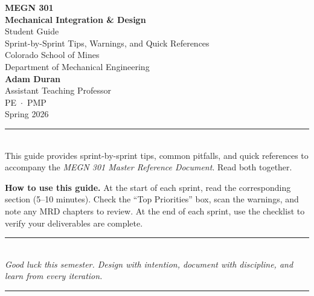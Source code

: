\documentclass[11pt,letterpaper]{article}
\newcommand{\currentsemester}{Spring 2026}
\begin{document}

\begin{center}
    \vspace*{0.5cm}
    {\Huge\bfseries\sffamily\textcolor{MinesBlue}{MEGN 301}}\\[0.3cm]
    {\Huge\bfseries\sffamily\textcolor{MinesBlue}{Mechanical Integration \& Design}}\\[1cm]
    {\huge\sffamily\textcolor{MinesBlue}{Student Guide}}\\[0.6cm]
    {\Large\sffamily Sprint-by-Sprint Tips, Warnings, and Quick References}\\[1.5cm]
    {\large\sffamily\textcolor{MinesSilver}{Colorado School of Mines}}\\[0.2cm]
    {\large\sffamily\textcolor{MinesSilver}{Department of Mechanical Engineering}}\\[1cm]
    {\Large\sffamily\textbf{Adam Duran}}\\[0.2cm]
    {\normalsize\sffamily Assistant Teaching Professor}\\[0.2cm]
    {\normalsize\sffamily\textcolor{MinesSilver}{PE \,$\cdot$\, PMP}}\\[1cm]
    {\normalsize\sffamily\textcolor{MinesSilver}{\currentsemester}}\\[0.5cm]
    \textcolor{MinesBlue}{\rule{0.6\textwidth}{1pt}}\\[0.3cm]
    {\small\sffamily This guide provides sprint-by-sprint tips, common pitfalls, and quick references to accompany the \textit{MEGN 301 Master Reference Document}. Read both together.}
\end{center}
\vspace{1cm}

\begin{protip}
\textbf{How to use this guide.} At the start of each sprint, read the corresponding section (5--10 minutes). Check the ``Top Priorities'' box, scan the warnings, and note any MRD chapters to review. At the end of each sprint, use the checklist to verify your deliverables are complete.
\end{protip}

\tableofcontents
\newpage















\vspace{1cm}
\begin{center}
\textcolor{MinesBlue}{\rule{0.4\textwidth}{1pt}}\\[6pt]
\textit{Good luck this semester. Design with intention, document with discipline, and learn from every iteration.}\\[6pt]
\textcolor{MinesBlue}{\rule{0.4\textwidth}{1pt}}
\end{center}
\end{document}
